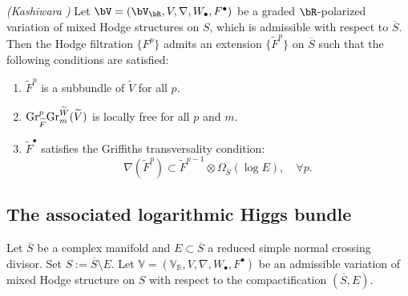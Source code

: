\documentclass[11pt,letterpaper]{amsart}
\numberwithin{equation}{section}
\begin{document}
\begin{prop} \emph{(Kashiwara \cite[Proposition 1.11.3]{Kashiwara1986})} \label{prop_Kashiwara_extendHodge}  
	Let $\bV = (\bV_{\bR}, V, \nabla, W_\bullet, F^\bullet)$ be a graded $\bR$-polarized variation of mixed Hodge structures on $S$, which is admissible with respect to $\overline{S}$. Then the Hodge filtration $\{F^p\}$ admits an extension $\{\widetilde{F}^p\}$ on $\overline{S}$ such that the following conditions are satisfied:  
	\begin{enumerate}  
		\item $\widetilde{F}^p$ is a subbundle of $\widetilde{V}$ for all $p$.  
		\item ${\rm Gr}_{\widetilde{F}}^p {\rm Gr}_m^{\widetilde{W}}(\widetilde{V})$ is locally free for all $p$ and $m$.  
		\item $\widetilde{F}^\bullet$ satisfies the Griffiths transversality condition:  
		$$
		\nabla(\widetilde{F}^p) \subset \widetilde{F}^{p-1} \otimes \Omega_{\overline{S}}(\log E), \quad \forall p.
		$$  
	\end{enumerate}  
\end{prop}
\subsection{The associated logarithmic Higgs bundle}\label{section_lHB_BM}
Let $\overline{S}$ be a complex manifold and $E \subset \overline{S}$ a reduced simple normal crossing divisor. Set $S := \overline{S} \setminus E$. Let $\mathbb{V} = (\mathbb{V}_\mathbb{R}, V, \nabla, W_\bullet, F^\bullet)$ be an admissible variation of mixed Hodge structure on $S$ with respect to the compactification $(\overline{S}, E)$.  
\end{document}
